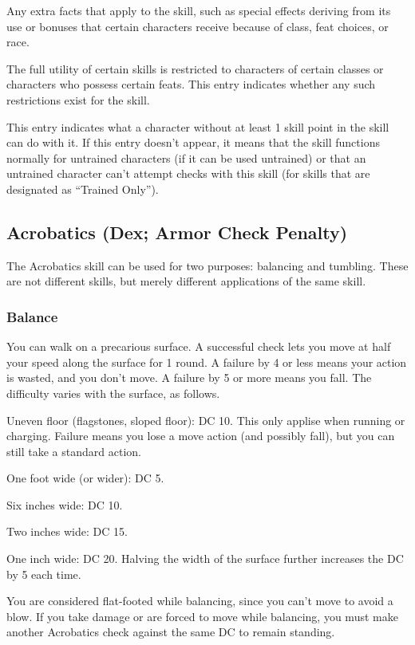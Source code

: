  Any extra facts that apply to the skill, such as special effects deriving from its use or bonuses that certain characters receive because of class, feat choices, or race.

 The full utility of certain skills is restricted to characters of certain classes or characters who possess certain feats. This entry indicates whether any such restrictions exist for the skill.

 This entry indicates what a character without at least 1 skill point in the skill can do with it. If this entry doesn't appear, it means that the skill functions normally for untrained characters (if it can be used untrained) or that an untrained character can't attempt checks with this skill (for skills that are designated as ``Trained Only'').

\subsection{Acrobatics (Dex; Armor Check Penalty)}
The Acrobatics skill can be used for two purposes: balancing and tumbling. These are not different skills, but merely different applications of the same skill.
\subsubsection{Balance}
 You can walk on a precarious surface. A successful check lets you move at half your speed along the surface for 1 round. A failure by 4 or less means your action is wasted, and you don't move. A failure by 5 or more means you fall. The difficulty varies with the surface, as follows.

\begin{itemize*}
  \item Uneven floor (flagstones, sloped floor): DC 10. This only applise when running or charging. Failure means you lose a move action (and possibly fall), but you can still take a standard action.
  \item One foot wide (or wider): DC 5. 
  \item Six inches wide: DC 10.
  \item Two inches wide: DC 15.
  \item One inch wide: DC 20. Halving the width of the surface further increases the DC by 5 each time.
\end{itemize*}

 You are considered flat-footed while balancing, since you can't move to avoid a blow. If you take damage or are forced to move while balancing, you must make another Acrobatics check against the same DC to remain standing.

